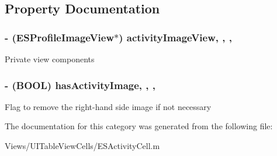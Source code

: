 \subsection{Property Documentation}
\hypertarget{category_e_s_activity_cell_07_08_a946918ea62fd624cf2ca5b4af5393c9e}{}
\subsubsection[{activity\+Image\+View}]{\setlength{\rightskip}{0pt plus 5cm}-\/ ({\bf E\+S\+Profile\+Image\+View}$\ast$) activity\+Image\+View\hspace{0.3cm}{\ttfamily [read]}, {\ttfamily [write]}, {\ttfamily [nonatomic]}, {\ttfamily [strong]}}\label{category_e_s_activity_cell_07_08_a946918ea62fd624cf2ca5b4af5393c9e}
Private view components \hypertarget{category_e_s_activity_cell_07_08_a977d8948d227016e3beeed5757dfb351}{}
\subsubsection[{has\+Activity\+Image}]{\setlength{\rightskip}{0pt plus 5cm}-\/ (B\+O\+O\+L) has\+Activity\+Image\hspace{0.3cm}{\ttfamily [read]}, {\ttfamily [write]}, {\ttfamily [nonatomic]}, {\ttfamily [assign]}}\label{category_e_s_activity_cell_07_08_a977d8948d227016e3beeed5757dfb351}
Flag to remove the right-\/hand side image if not necessary 

The documentation for this category was generated from the following file\+:\begin{DoxyCompactItemize}
\item 
Views/\+U\+I\+Table\+View\+Cells/E\+S\+Activity\+Cell.\+m\end{DoxyCompactItemize}
